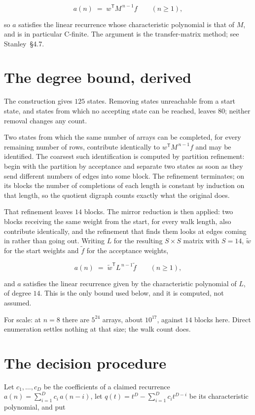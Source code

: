 \documentclass[11pt]{article}
\theoremstyle{definition}
\begin{document}
\[a(n) \;=\; w^{\mathsf T} M^{\,n-1} f \qquad (n \ge 1),\]

so $a$ satisfies the linear recurrence whose characteristic polynomial is that of $M$, and is in particular C-finite. The argument is the transfer-matrix method; see Stanley~\S4.7.

\section{The degree bound, derived}

The construction gives $125$ states. Removing states unreachable from a start state, and states from which no accepting state can be reached, leaves $80$; neither removal changes any count.

Two states from which the same number of arrays can be completed, for every remaining number of rows, contribute identically to $w^{\mathsf T}M^{\,n-1}f$ and may be identified. The coarsest such identification is computed by partition refinement: begin with the partition by acceptance and separate two states as soon as they send different numbers of edges into some block. The refinement terminates; on its blocks the number of completions of each length is constant by induction on that length, so the quotient digraph counts exactly what the original does.

That refinement leaves $14$ blocks. The mirror reduction is then applied: two blocks receiving the same weight from the start, for every walk length, also contribute identically, and the refinement that finds them looks at edges coming in rather than going out. Writing $L$ for the resulting $S \times S$ matrix with $S = 14$, $\tilde w$ for the start weights and $\tilde f$ for the acceptance weights,

\[a(n) \;=\; \tilde w^{\mathsf T} L^{\,n-1} \tilde f \qquad (n \ge 1),\]

and $a$ satisfies the linear recurrence given by the characteristic polynomial of $L$, of degree $14$. This is the only bound used below, and it is computed, not assumed.

For scale: at $n = 8$ there are $5^{24}$ arrays, about $10^{17}$, against $14$ blocks here. Direct enumeration settles nothing at that size; the walk count does.

\section{The decision procedure}

Let $c_1,\dots,c_D$ be the coefficients of a claimed recurrence $a(n) = \sum_{i=1}^{D} c_i\,a(n-i)$, let $q(t) = t^{D} - \sum_{i=1}^{D} c_i t^{D-i}$ be its characteristic polynomial, and put
\end{document}
